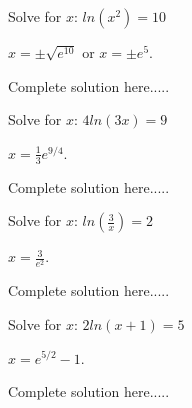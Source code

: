 \begin{example}
Solve for $x$: $ln(x^2)=10$
    \begin{sol}
    $x=\pm \sqrt{e^{10}}$ or $x=\pm e^5$.
    \end{sol}
    \begin{solL}
    Complete solution here.....
    
    \end{solL}
    
\end{example}
\newpage
\begin{example}
Solve for $x$: $4ln(3x)=9$
    \begin{sol}
    $x=\displaystyle\frac{1}{3}e^{9/4}$.
    \end{sol}
    \begin{solL}
    Complete solution here.....
    
    \end{solL}
    
\end{example}
\begin{example}
Solve for $x$: $ln\left(\displaystyle\frac{3}{x}\right)=2$
    \begin{sol}
    $x=\displaystyle\frac{3}{e^2}$.
    \end{sol}
    \begin{solL}
    Complete solution here.....
    
    \end{solL}
    
\end{example}
\begin{example}
Solve for $x$: $2ln(x+1)=5$
    \begin{sol}
    $x=e^{5/2}-1$.
    \end{sol}
    \begin{solL}
    Complete solution here.....
    
    \end{solL}
    
\end{example}
